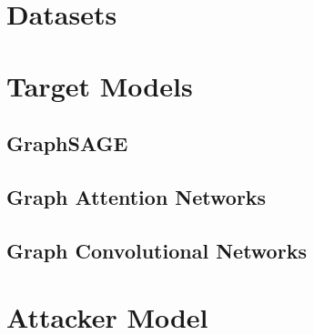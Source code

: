   \section{Datasets}

  \section{Target Models}

    \subsection{GraphSAGE}

    \subsection{Graph Attention Networks}

    \subsection{Graph Convolutional Networks}

  \section{Attacker Model}

